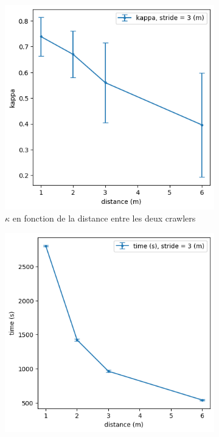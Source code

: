 \documentclass[francais,RandD]{rapportPFE}
\begin{document}
			\begin{figure}[h!]
				\begin{subfigure}[t]{0.49\linewidth}
					\includegraphics[width=\linewidth]{graphics/ski_nordique-kappa_vs_distance.png}
					\caption{$\kappa$ en fonction de la distance entre les deux crawlers}
					\label{fig:ski_nordique-kappa_vs_distance}
				\end{subfigure}
				\hfill
				\begin{subfigure}[t]{0.49\linewidth}
						\includegraphics[width=\linewidth]{graphics/ski_nordique-time_vs_distance.png}

\end{subfigure}
\end{figure}
\end{document}

